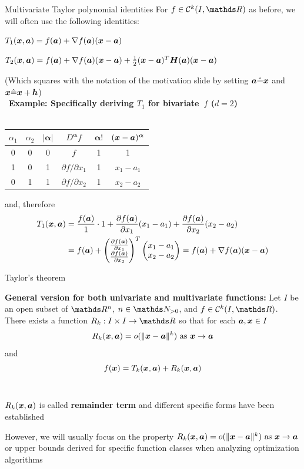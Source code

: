 \documentclass[11pt,compress,t,notes=noshow, xcolor=table]{beamer}
\begin{document}
\begin{framev}{Multivariate Taylor polynomial identities}
For $f \in \mathcal{C}^k(I,\R)$ as before, we will often use the following identities:
\begin{itemizeM}
\item $T_1(\bm{x},\bm{a})=f(\bm{a}) + \nabla f(\bm{a}) (\bm{x} - \bm{a})$
\item $T_2(\bm{x},\bm{a})=f(\bm{a}) + \nabla f(\bm{a}) (\bm{x} - \bm{a}) + \frac{1}{2}(\bm{x} - \bm{a})^T\bm{H}(\bm{a})(\bm{x} - \bm{a})$
\end{itemizeM}
({\footnotesize Which squares with the notation of the motivation slide by setting $\bm{a}\hat{=}\bm{x}$ and $\bm{x}\hat{=}\bm{x}+\bm{h}$})\\\,
\textbf{Example: Specifically deriving $T_1$ for bivariate~$f$ ($d=2$)}\\\,
\begin{tabular}{c|c||c|c|c|c}
$\alpha_1$ & $\alpha_2$ & $|\bm{\alpha}|$ & $D^{\bm{\alpha}} f$ & $\bm{\alpha}!$ & $(\bm{x}-\bm{a})^{\bm{\alpha}}$ \\ \hline\hline
0 & 0 & 0 & $f$                         & 1 & 1          \\ \hline
1 & 0 & 1 & $\partial f / \partial x_1$ & 1 & $x_1-a_1$  \\ \hline
0 & 1 & 1 & $\partial f / \partial x_2$ & 1 & $x_2-a_2$
\end{tabular} and, therefore
\begin{align*}
T_1(\bm{x},\bm{a}) &= \frac{f(\bm{a})}{1} \cdot 1 + \frac{\partial f(\bm{a})}{\partial x_1} (x_1 - a_1) + \frac{\partial f(\bm{a})}{\partial x_2} (x_2 - a_2) \\
&= f(\bm{a}) + \begin{pmatrix}\frac{\partial f(\bm{a})}{\partial x_1} \\ \frac{\partial f(\bm{a})}{\partial x_2}\end{pmatrix}^T \begin{pmatrix}x_1 - a_1 \\ x_2 - a_2\end{pmatrix} = f(\bm{a}) + \nabla f(\bm{a}) (\bm{x} - \bm{a})
\end{align*}
\end{framev}


\begin{framei}{Taylor's theorem}
\item[] \textbf{General version for both univariate and multivariate functions:}
Let $I$ be an open subset of $\R^n$, $n\in\N_{>0}$, and $f \in \mathcal{C}^k(I,\R)$.
There exists a function $R_k:I\times I\rightarrow \R$ so that for each $\bm{a},\bm{x} \in I$
$$
R_k(\bm{x}, \bm{a}) = {o}(\|\bm{x}-\bm{a}\|^k) \text{ as } \bm{x} \to \bm{a}
$$
and 
$$
f(\bm{x}) =T_k(\bm{x}, \bm{a})+ R_k(\bm{x}, \bm{a})
$$\,\\
\item $R_k(\bm{x}, \bm{a})$ is called \textbf{remainder term} and different specific forms have been established
\item However, we will usually focus on the property $R_k(\bm{x}, \bm{a}) = {o}(\|\bm{x}-\bm{a}\|^k) \text{ as } \bm{x} \to \bm{a}$ or upper bounds derived for specific function classes when analyzing optimization algorithms
\end{framei}
\end{document}
